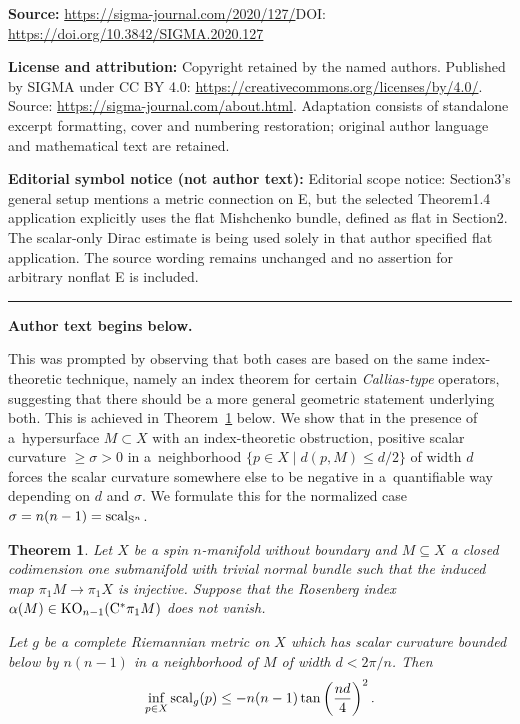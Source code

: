 \documentclass[11pt]{article}
\numberwithin{equation}{section}
\newtheorem{Theorem}{Theorem}[section]
\begin{document}
\noindent\textbf{Source:} \url{https://sigma-journal.com/2020/127/}\quad DOI: \url{https://doi.org/10.3842/SIGMA.2020.127}\par
\noindent\textbf{License and attribution:} Copyright retained by the named authors. Published by SIGMA under CC BY 4.0: \url{https://creativecommons.org/licenses/by/4.0/}. Source: \url{https://sigma-journal.com/about.html}. Adaptation consists of standalone excerpt formatting, cover and numbering restoration; original author language and mathematical text are retained.\par
\noindent\textbf{Editorial symbol notice (not author text):} Editorial scope notice: Section3’s general setup mentions a metric connection on E, but the selected Theorem1.4 application explicitly uses the flat Mishchenko bundle, defined as flat in Section2. The scalar-only Dirac estimate is being used solely in that author specified flat application. The source wording remains unchanged and no assertion for arbitrary nonflat E is included.\par
\medskip\hrule\medskip\noindent\textbf{Author text begins below.}\par
\setcounter{section}{1}
\setcounter{subsection}{0}
\setcounter{subsubsection}{0}
\setcounter{Theorem}{3}
\setcounter{equation}{0}
This was prompted by observing that both cases are based on the same index-theoretic technique, namely an index theorem for certain \emph{Callias-type} operators, suggesting that there should be a more general geometric statement underlying both.
This is achieved in Theorem~\ref{thm:quantitative-codim1-obstr} below.
We show that in the presence of a~hypersurface \(M \subset X\) with an index-theoretic obstruction, positive scalar curvature \(\geq \sigma > 0\) in a~neighborhood \(\{p \in X \mid d(p, M) \leq d/2 \}\) of width \(d\) forces the scalar curvature somewhere else to be negative in a~quantifiable way depending on \(d\) and \(\sigma\).
We formulate this for the normalized case \(\sigma = n(n-1) = \operatorname{scal}_{\mathrm{S}^n}\).

\begin{Theorem} \label{thm:quantitative-codim1-obstr}
 Let \(X\) be a spin \(n\)-manifold without boundary and \(M \subseteq X\) a closed codimension one submanifold with trivial normal bundle such that the induced map \(\pi_1 M \to \pi_1 X\) is injective.
 Suppose that the Rosenberg index \(\alpha(M) \in \operatorname{KO}_{n-1}(\mathrm{C}^\ast \pi_1 M)\) does not vanish.

 Let \(g\) be a complete Riemannian metric on \(X\) which has scalar curvature bounded below by \(n(n-1)\) in a neighborhood of \(M\) of width \(d < 2\pi/n\).
 Then
 \begin{equation} \label{eq:negativity}
 \inf_{p \in X} \scal_g(p) \leq - n(n-1) \tan\left(\frac{nd}{4}\right)^2.
 \end{equation}
\end{Theorem}
\end{document}
